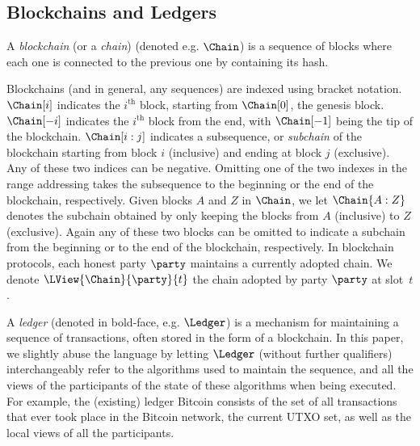 \subsection{Blockchains and Ledgers}
A \emph{blockchain} (or a \emph{chain}) (denoted e.g. $\Chain$)  is a sequence
of blocks where each one is connected to the previous one by containing its
hash.

Blockchains (and in general, any sequences) are indexed using bracket notation.
$\Chain[i]$ indicates the $i^{\text{th}}$ block, starting from $\Chain[0]$, the
genesis block. $\Chain[-i]$ indicates the $i^{\text{th}}$ block from the end,
with $\Chain[-1]$ being the tip of the blockchain. $\Chain[i:j]$ indicates a
subsequence, or \emph{subchain} of the blockchain starting from block $i$
(inclusive) and ending at block $j$ (exclusive). Any of these two indices can be
negative. Omitting one of the two indexes in the range addressing takes the
subsequence to the beginning or the end of the blockchain, respectively. Given
blocks $A$ and $Z$ in $\Chain$, we let $\Chain\{A:Z\}$ denotes the subchain
obtained by only keeping the blocks from $A$ (inclusive) to $Z$ (exclusive).
Again any of these two blocks can be omitted to indicate a subchain from the
beginning or to the end of the blockchain, respectively. In blockchain
protocols, each honest party $\party$ maintains a currently adopted chain. We
denote $\LView{\Chain}{\party}{t}$ the chain adopted by party $\party$ at slot~$t$.

A \emph{ledger} (denoted in bold-face, e.g. $\Ledger$) is a mechanism for
maintaining a sequence of transactions, often stored in the form of a
blockchain.  In this paper, we slightly abuse the language by letting $\Ledger$
(without further qualifiers) interchangeably refer to the algorithms used to
maintain the sequence, and all the views of the participants of the state of
these algorithms when being executed.  For example, the (existing) ledger
Bitcoin consists of the set of all transactions that ever took place in the
Bitcoin network, %
the current UTXO set, as well as the
local views of all the participants.

